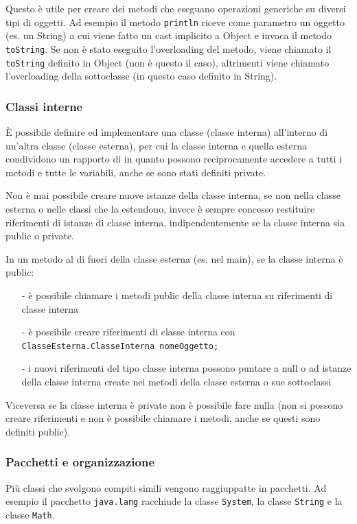 \documentclass{article}
\begin{document}
Questo è utile per creare dei metodi che eseguano operazioni generiche su diversi tipi di oggetti. Ad esempio il metodo \verb|println| riceve
come parametro un oggetto (es. un String) a cui viene fatto un cast implicito a Object e invoca il metodo \verb|toString|. Se non è stato eseguito
l'overloading del metodo, viene chiamato il \verb|toString| definito in Object (non è questo il caso), altrimenti viene chiamato l'overloading della
sottoclasse (in questo caso definito in String).

\subsubsection*{Classi interne}
È possibile definire ed implementare una classe (classe interna) all'interno di un'altra classe (classe esterna), per cui la classe interna e
quella esterna condividono un rapporto di  in quanto possono reciprocamente accedere a tutti i metodi e tutte le variabili, anche
se sono stati definiti private.

Non è mai possibile creare nuove istanze della classe interna, se non nella classe esterna o nelle classi che la estendono, invece è sempre
concesso restituire riferimenti di istanze di classe interna, indipendentemente se la classe interna sia public o private.

In un metodo al di fuori della classe esterna (es. nel main), se la classe interna è public:
\begin{itemize} [topsep=3pt, itemsep=0pt]
	\item[-] è possibile chiamare i metodi public della classe interna su riferimenti di classe interna
	\item[-] è possibile creare riferimenti di classe interna con \verb|ClasseEsterna.ClasseInterna nomeOggetto;|
	\item[-] i nuovi riferimenti del tipo classe interna possono puntare a null o ad istanze della classe interna create nei metodi della classe
	esterna o sue sottoclassi
\end{itemize}

Viceversa se la classe interna è private non è possibile fare nulla (non si possono creare riferimenti e non è possibile chiamare i metodi, anche
se questi sono definiti public).

\subsubsection*{Pacchetti e organizzazione}
Più classi che svolgono compiti simili vengono raggiuppatte in pacchetti. Ad esempio il pacchetto \verb|java.lang| racchiude la classe
\verb|System|, la classe \verb|String| e la classe \verb|Math|.
\end{document}
